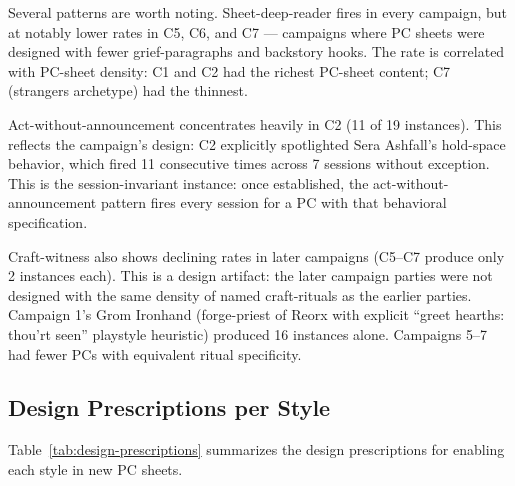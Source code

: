Several patterns are worth noting. Sheet-deep-reader fires in every campaign,
but at notably lower rates in C5, C6, and C7 --- campaigns where PC sheets were
designed with fewer grief-paragraphs and backstory hooks. The rate is correlated
with PC-sheet density: C1 and C2 had the richest PC-sheet content; C7 (strangers
archetype) had the thinnest.

Act-without-announcement concentrates heavily in C2 (11 of 19 instances). This reflects
the campaign's design: C2 explicitly spotlighted Sera Ashfall's hold-space behavior,
which fired 11 consecutive times across 7 sessions without exception. This is the
session-invariant instance: once established, the act-without-announcement pattern
fires every session for a PC with that behavioral specification.

Craft-witness also shows declining rates in later campaigns (C5--C7 produce only 2
instances each). This is a design artifact: the later campaign parties were not designed
with the same density of named craft-rituals as the earlier parties. Campaign 1's
Grom Ironhand (forge-priest of Reorx with explicit ``greet hearths: thou'rt seen''
playstyle heuristic) produced 16 instances alone. Campaigns 5--7 had fewer PCs with
equivalent ritual specificity.

\subsection{Design Prescriptions per Style}

Table~\ref{tab:design-prescriptions} summarizes the design prescriptions for enabling
each style in new PC sheets.

